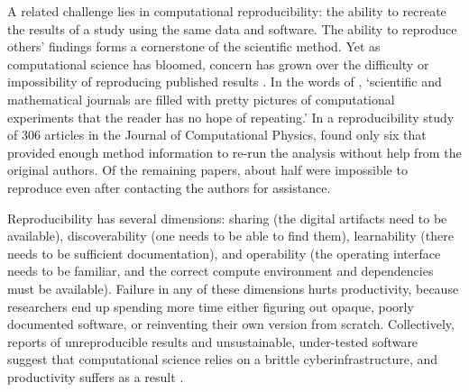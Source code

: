 \documentclass{article} %
\begin{document}
A related challenge lies in computational reproducibility: the ability to recreate the results of a study using the same data and software. The ability to reproduce others' findings forms a cornerstone of the scientific method. Yet as computational science has bloomed, concern has grown over the difficulty or impossibility of reproducing published results \citep[e.g.,][]{schwab2000making,peng2011reproducible,stodden2013setting,barba2016hard,alnoamany2018towards,chen2019open,krafczyk2019scientific}. In the words of \citet{leveque2009python}, `scientific and mathematical journals are filled with pretty pictures of computational experiments that the reader has no hope of repeating.' In a reproducibility study of 306 articles in the Journal of Computational Physics, \citet{stodden2018enabling} found only six that provided enough method information to re-run the analysis without help from the original authors. Of the remaining papers, about half were impossible to reproduce even after contacting the authors for assistance.

Reproducibility has several dimensions: sharing (the digital artifacts need to be available), discoverability (one needs to be able to find them), learnability (there needs to be sufficient documentation), and operability (the operating interface needs to be familiar, and the correct compute environment and dependencies must be available). Failure in any of these dimensions hurts productivity, because researchers end up spending more time either figuring out opaque, poorly documented software, or reinventing their own version from scratch. Collectively, reports of unreproducible results and unsustainable, under-tested software suggest that computational science relies on a brittle cyberinfrastructure, and productivity suffers as a result \citep{wilson2006s,faulk2009scientific,prabhu2011survey}.
\end{document}
